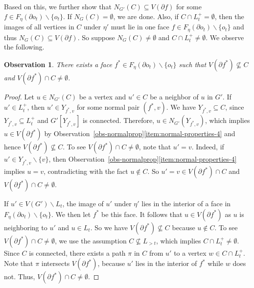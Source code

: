 \documentclass[a4paper,11pt]{article}
\numberwithin{lemma}{section}
\newtheorem{observation}[lemma]{Observation}
\begin{document}
Based on this, we further show that $N_{G'}(C) \subseteq V(\partial f)$ for some $f \in F_\eta(\partial o_t) \backslash \{o_t\}$.
If $N_G(C) = \emptyset$, we are done.
Also, if $C \cap L_t^+ = \emptyset$, then the images of all vertices in $C$ under $\eta'$ must lie in one face $f \in F_\eta(\partial o_t) \backslash \{o_t\}$ and thus $N_G(C) \subseteq V(\partial f)$.
So suppose $N_G(C) \neq \emptyset$ and $C \cap L_t^+ \neq \emptyset$.
We observe the following.

\begin{observation}
There exists a face $f^* \in F_\eta(\partial o_t) \backslash \{o_t\}$ such that $V(\partial f^*) \nsubseteq C$ and $V(\partial f^*) \cap C \neq \emptyset$.
\end{observation}
\begin{proof}
Let $u \in N_{G'}(C)$ be a vertex and $u' \in C$ be a neighbor of $u$ in $G'$.
If $u' \in L_t^+$, then $u' \in Y_{f^*,v}$ for some normal pair $(f^*,v)$.
We have $Y_{f^*,v} \subseteq C$, since $Y_{f^*,v} \subseteq L_t^+$ and $G'[Y_{f^*,v}]$ is connected.
Therefore, $u \in N_{G'}(Y_{f^*,v})$, which implies $u \in V(\partial f^*)$ by Observation~\ref{obs-normalprop}\ref{item:normal-properties-4} and hence $V(\partial f^*) \nsubseteq C$.
To see $V(\partial f^*) \cap C \neq \emptyset$, note that $u' = v$.
Indeed, if $u' \in Y_{f^*,v} \backslash \{v\}$, then Observation~\ref{obs-normalprop}\ref{item:normal-properties-4} implies $u = v$, contradicting with the fact $u \notin C$.
So $u' = v \in V(\partial f^*) \cap C$ and $V(\partial f^*) \cap C \neq \emptyset$.

If $u' \in V(G') \backslash L_t$, the image of $u'$ under $\eta'$ lies in the interior of a face in $F_\eta(\partial o_t) \backslash \{o_t\}$.
We then let $f^*$ be this face.
It follows that $u \in V(\partial f^*)$ as $u$ is neighboring to $u'$ and $u \in L_t$.
So we have $V(\partial f^*) \nsubseteq C$ because $u \notin C$.
To see $V(\partial f^*) \cap C \neq \emptyset$, we use the assumption $C \nsubseteq L_{>t}$, which implies $C \cap L_t^+ \neq \emptyset$.
Since $C$ is connected, there exists a path $\pi$ in $C$ from $u'$ to a vertex $w \in C \cap L_t^+$.
Note that $\pi$ intersects $V(\partial f^*)$, because $u'$ lies in the interior of $f^*$ while $w$ does not.
Thus, $V(\partial f^*) \cap C \neq \emptyset$.
\end{proof}
\end{document}
